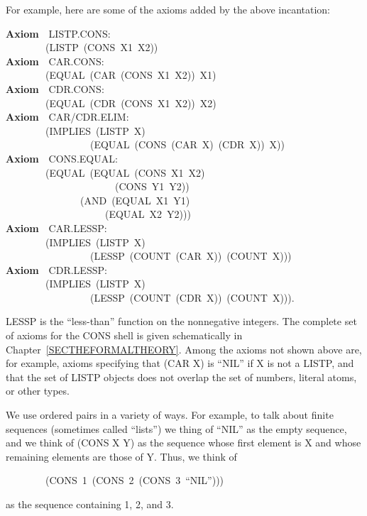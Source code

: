 \documentclass[10pt]{book}
\newenvironment{pubasis}{\begin{flushleft}}{\end{flushleft}}
\newcommand{\axiomordefinition}[1]{\vspace{6pt}\Large\textsf{\textbf{#1}}\normalsize}
\begin{document}
For example, here are some of the axioms added by the above
incantation:
\begin{pubasis}
\axiomordefinition{Axiom}~~LISTP.CONS:\\
~~~~~~~~(LISTP~(CONS~X1~X2))\\

\axiomordefinition{Axiom}~~CAR.CONS:\\
~~~~~~~~(EQUAL~(CAR~(CONS~X1~X2))~X1)\\

\axiomordefinition{Axiom}~~CDR.CONS:\\
~~~~~~~~(EQUAL~(CDR~(CONS~X1~X2))~X2)\\

\axiomordefinition{Axiom}~~CAR/CDR.ELIM:\\
~~~~~~~~(IMPLIES~(LISTP~X)\\
~~~~~~~~~~~~~~~~~(EQUAL~(CONS~(CAR~X)~(CDR~X))~X))\\

\axiomordefinition{Axiom}~~CONS.EQUAL:\\
~~~~~~~~(EQUAL~(EQUAL~(CONS~X1~X2)\\
~~~~~~~~~~~~~~~~~~~~~~(CONS~Y1~Y2))\\
~~~~~~~~~~~~~~~(AND~(EQUAL~X1~Y1)\\
~~~~~~~~~~~~~~~~~~~~(EQUAL~X2~Y2)))\\

\axiomordefinition{Axiom}~~CAR.LESSP:\\
~~~~~~~~(IMPLIES~(LISTP~X)\\
~~~~~~~~~~~~~~~~~(LESSP~(COUNT~(CAR~X))~(COUNT~X)))\\

\axiomordefinition{Axiom}~~CDR.LESSP:\\
~~~~~~~~(IMPLIES~(LISTP~X)\\
~~~~~~~~~~~~~~~~~(LESSP~(COUNT~(CDR~X))~(COUNT~X))).\\
\end{pubasis}
LESSP is the ``less-than'' function on the nonnegative integers.
The complete set of axioms for the CONS shell is given schematically in Chapter~\ref{SECTHEFORMALTHEORY}.
Among the axioms not shown above are, for example, axioms specifying
that (CAR X) is ``NIL'' if X is not a LISTP, and that the set of LISTP
objects does not overlap the set of numbers, literal atoms, or other
types.

We use ordered pairs in a variety of ways.  For example, to talk
about finite sequences (sometimes called ``lists'') we thing of ``NIL'' as
the empty sequence, and
we think of (CONS X Y) as
the sequence whose first element is X and whose
remaining elements are those of  Y.  Thus, we think of
\begin{pubasis}
~~~~~~~~(CONS~1~(CONS~2~(CONS~3~``NIL'')))\\
\end{pubasis}
as the sequence containing 1, 2, and 3.
\end{document}
